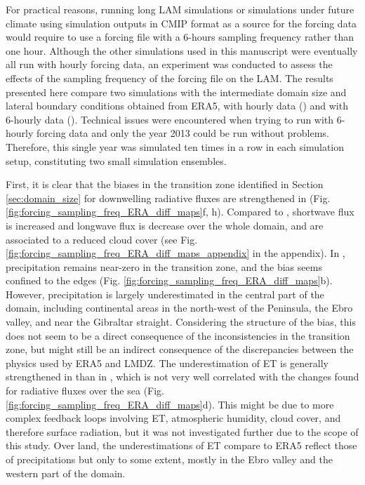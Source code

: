 For practical reasons, running long LAM simulations or simulations under future climate using simulation outputs in CMIP format as a source for the forcing data would require to use a forcing file with a 6-hours sampling frequency rather than one hour. 
Although the other simulations used in this manuscript were eventually all run with hourly forcing data, an experiment was conducted to assess the effects of the sampling frequency of the forcing file on the LAM. 
The results presented here compare two simulations with the intermediate domain size and lateral boundary conditions obtained from ERA5, with hourly data (\forcingoneh) and with 6-hourly data (\forcingsixh). Technical issues were encountered when trying to run with 6-hourly forcing data and only the year 2013 could be run without problems. Therefore, this single year was simulated ten times in a row in each simulation setup, constituting two small simulation ensembles.

\hfill

First, it is clear that the biases in the transition zone identified in Section \ref{sec:domain_size} for downwelling radiative fluxes are strengthened in \forcingsixh (Fig. \ref{fig:forcing_sampling_freq_ERA_diff_maps}f, h). 
Compared to \forcingoneh, shortwave flux is increased and longwave flux is decrease over the whole domain, and are associated to a reduced cloud cover (see Fig. \ref{fig:forcing_sampling_freq_ERA_diff_maps_appendix} in the appendix).
In \forcingsixh, precipitation remains near-zero in the transition zone, and the bias seems confined to the edges (Fig. \ref{fig:forcing_sampling_freq_ERA_diff_maps}b). However, precipitation is largely underestimated in the central part of the domain, including continental areas in the north-west of the Peninsula, the Ebro valley, and near the Gibraltar straight. Considering the structure of the bias, this does not seem to be a direct consequence of the inconsistencies in the transition zone, but might still be an indirect consequence of the discrepancies between the physics used by ERA5 and LMDZ.
The underestimation of ET is generally strengthened in \forcingsixh than in \forcingoneh, which is not very well correlated with the changes found for radiative fluxes over the sea (Fig. \ref{fig:forcing_sampling_freq_ERA_diff_maps}d). This might be due to more complex feedback loops involving ET, atmospheric humidity, cloud cover, and therefore surface radiation, but it was not investigated further due to the scope of this study.
Over land, the underestimations of ET compare to ERA5 reflect those of precipitations but only to some extent, mostly in the Ebro valley and the western part of the domain.

